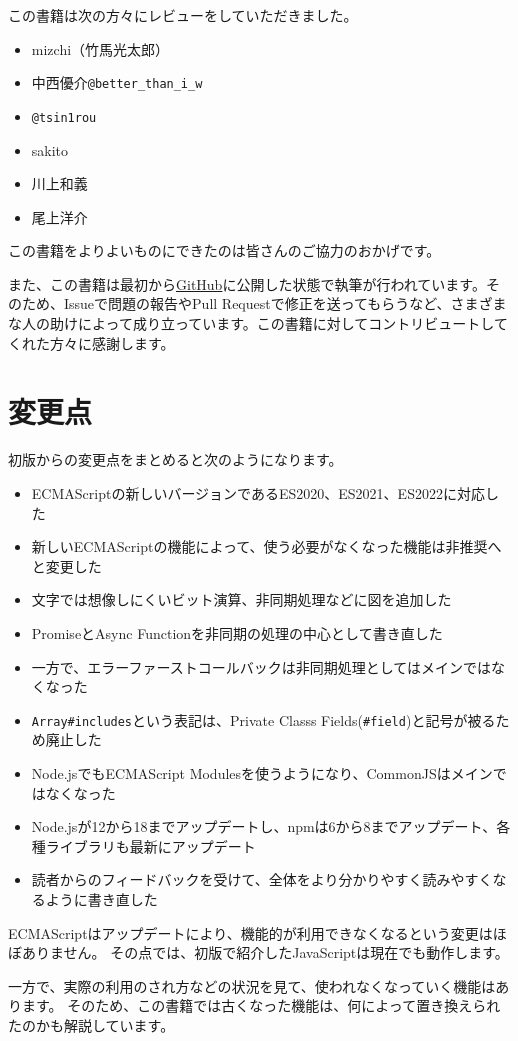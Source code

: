 この書籍は次の方々にレビューをしていただきました。

\begin{itemize}
\item mizchi（竹馬光太郎）
\item 中西優介\texttt{@better\_than\_i\_w}
\item \texttt{@tsin1rou}
\item sakito
\item 川上和義
\item 尾上洋介
\end{itemize}

この書籍をよりよいものにできたのは皆さんのご協力のおかげです。

また、この書籍は最初から\href{https://github.com/asciidwango/js-primer}{GitHub}に公開した状態で執筆が行われています。そのため、Issueで問題の報告やPull Requestで修正を送ってもらうなど、さまざまな人の助けによって成り立っています。この書籍に対してコントリビュートしてくれた方々に感謝します。

\hypertarget{changelog}{%
\section*{変更点}\label{changelog}}

初版からの変更点をまとめると次のようになります。

\begin{itemize}
\item ECMAScriptの新しいバージョンであるES2020、ES2021、ES2022に対応した
\item 新しいECMAScriptの機能によって、使う必要がなくなった機能は非推奨へと変更した
\item 文字では想像しにくいビット演算、非同期処理などに図を追加した
\item PromiseとAsync Functionを非同期の処理の中心として書き直した
\item 一方で、エラーファーストコールバックは非同期処理としてはメインではなくなった
\item \texttt{Array\#includes}という表記は、Private Classs Fields(\texttt{\#field})と記号が被るため廃止した
\item Node.jsでもECMAScript Modulesを使うようになり、CommonJSはメインではなくなった
\item Node.jsが12から18までアップデートし、npmは6から8までアップデート、各種ライブラリも最新にアップデート
\item 読者からのフィードバックを受けて、全体をより分かりやすく読みやすくなるように書き直した
\end{itemize}

ECMAScriptはアップデートにより、機能的が利用できなくなるという変更はほぼありません。
その点では、初版で紹介したJavaScriptは現在でも動作します。

一方で、実際の利用のされ方などの状況を見て、使われなくなっていく機能はあります。
そのため、この書籍では古くなった機能は、何によって置き換えられたのかも解説しています。
